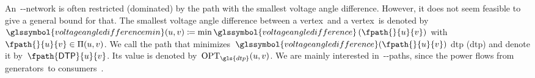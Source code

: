 % 
An~\source-\sink-network is often restricted (dominated) by the path with
the smallest voltage angle difference. However, it does not seem feasible to
give a general bound for that. %
The smallest voltage angle difference between a vertex~\vertexa and a
vertex~\vertexb is denoted by~$\glssymbol{voltageangledifferencemin}(\vertexa,\vertexb) \coloneqq
\min\glssymbol{voltageangledifference}\left(\fpath{}{\vertexa}
{\vertexb}\right)$ with $
\fpath{}{\vertexa}{\vertexb}\in\paths(\vertexa,\vertexb)$. 
% 
% 
We call the path that minimizes~$\glssymbol{voltageangledifference}(\fpath{}{\vertexa}{\vertexb})$
\acrlong{dtp} (\gls{dtp}) and denote it by~$\fpath{\dtp}{\vertexa}
{\vertexb}$. Its
value is
denoted by~$\opt_{\gls{dtp}}(\vertexa,\vertexb)$. 
%  
%
We are mainly interested in~\source-\sink-paths, since the power flows from
generators~\source to consumers~\sink.
% 
%
\def\HiLi{\leavevmode\rlap{\hbox to \hsize{\color{HiLi}\leaders\hrule
height .9\baselineskip depth 1.3ex\hfill}}}
